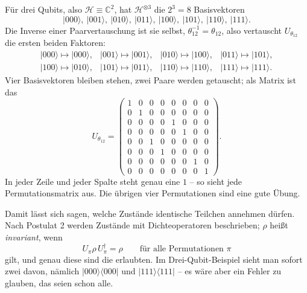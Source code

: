 \begin{beispiel}
  Für drei Qubits, also $\mathcal{H}\equiv \mathbb{C}^2$, hat $\mathcal{H}^{\otimes 3}$ die $2^3 = 8$ Basisvektoren
  \begin{equation}
    |000\rangle,\ |001\rangle,\ |010\rangle,\ |011\rangle,\ |100\rangle,\ |101\rangle,\ |110\rangle,\ |111\rangle.
  \end{equation}
  Die Inverse einer Paarvertauschung ist sie selbst, $\theta_{12}^{-1} = \theta_{12}$, also vertauscht $U_{\theta_{12}}$ die ersten beiden Faktoren:
  \begin{equation}
    \begin{array}{llll}
      |000\rangle \mapsto |000\rangle, & |001\rangle \mapsto |001\rangle, & |010\rangle \mapsto |100\rangle, & |011\rangle \mapsto |101\rangle,\\
      |100\rangle \mapsto |010\rangle, & |101\rangle \mapsto |011\rangle, & |110\rangle \mapsto |110\rangle, & |111\rangle \mapsto |111\rangle.
    \end{array}
  \end{equation}
  Vier Basisvektoren bleiben stehen, zwei Paare werden getauscht; als Matrix ist das
  \begin{equation}
    U_{\theta_{12}} = \begin{pmatrix}
      1&0&0&0&0&0&0&0\\
      0&1&0&0&0&0&0&0\\
      0&0&0&0&1&0&0&0\\
      0&0&0&0&0&1&0&0\\
      0&0&1&0&0&0&0&0\\
      0&0&0&1&0&0&0&0\\
      0&0&0&0&0&0&1&0\\
      0&0&0&0&0&0&0&1
    \end{pmatrix}.
  \end{equation}
  In jeder Zeile und jeder Spalte steht genau eine $1$ -- so sieht jede Permutationsmatrix aus. Die übrigen vier Permutationen sind eine gute Übung.
\end{beispiel}

Damit lässt sich sagen, welche Zustände identische Teilchen annehmen dürfen. Nach Postulat 2 werden Zustände mit Dichteoperatoren beschrieben; $\rho$ heißt \emph{invariant}, wenn
\begin{equation}
  U_\pi \rho\, U_\pi^\dagger = \rho \qquad \text{für alle Permutationen $\pi$}
\end{equation}
gilt, und genau diese sind die erlaubten. Im Drei-Qubit-Beispiel sieht man sofort zwei davon, nämlich $|000\rangle\langle 000|$ und $|111\rangle\langle 111|$ -- es wäre aber ein Fehler zu glauben, das seien schon alle.

